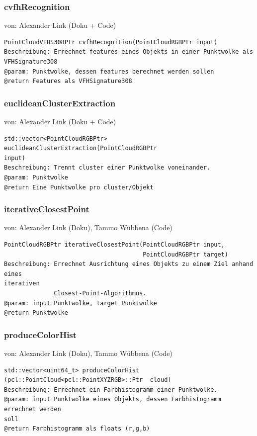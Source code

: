 \documentclass{suturo}
\makeatletter
\newcommand{\chapterauthor}[1]{%
  {\parindent0pt\vspace*{-27pt}%
  \linespread{0}\small\begin{flushright}von: #1\end{flushright}%
  \par\nobreak\vspace*{0pt}}
  \@afterheading%
}
\makeatother
\begin{document}
\subsubsection{cvfhRecognition}
\chapterauthor{Alexander Link (Doku + Code)}
\begin{verbatim}
PointCloudVFHS308Ptr cvfhRecognition(PointCloudRGBPtr input)
Beschreibung: Errechnet features eines Objekts in einer Punktwolke als
VFHSignature308
@param: Punktwolke, dessen features berechnet werden sollen
@return Features als VFHSignature308
\end{verbatim}\label{func:cvfhRecognition}

\subsubsection{euclideanClusterExtraction}
\chapterauthor{Alexander Link (Doku + Code)}
\begin{verbatim}
std::vector<PointCloudRGBPtr> euclideanClusterExtraction(PointCloudRGBPtr
input)
Beschreibung: Trennt cluster einer Punktwolke voneinander.
@param: Punktwolke
@return Eine Punktwolke pro cluster/Objekt
\end{verbatim}\label{func:euclideanClusterExtraction}

\subsubsection{iterativeClosestPoint}
\chapterauthor{Alexander Link (Doku), Tammo Wübbena (Code)}
\begin{verbatim}
PointCloudRGBPtr iterativeClosestPoint(PointCloudRGBPtr input,
                                       PointCloudRGBPtr target)
Beschreibung: Errechnet Ausrichtung eines Objekts zu einem Ziel anhand eines
iterativen 
			  Closest-Point-Algorithmus.
@param: input Punktwolke, target Punktwolke
@return Punktwolke
\end{verbatim}\label{func:iterativeClosestPoint}

\subsubsection{produceColorHist}
\chapterauthor{Alexander Link (Doku), Tammo Wübbena (Code)}
\begin{verbatim}
std::vector<uint64_t> produceColorHist
(pcl::PointCloud<pcl::PointXYZRGB>::Ptr  cloud)
Beschreibung: Errechnet ein Farbhistogramm einer Punktwolke.
@param: input Punktwolke eines Objekts, dessen Farbhistogramm errechnet werden
soll
@return Farbhistogramm als floats (r,g,b)
\end{verbatim}\label{func:produceColorHist}
\end{document}
